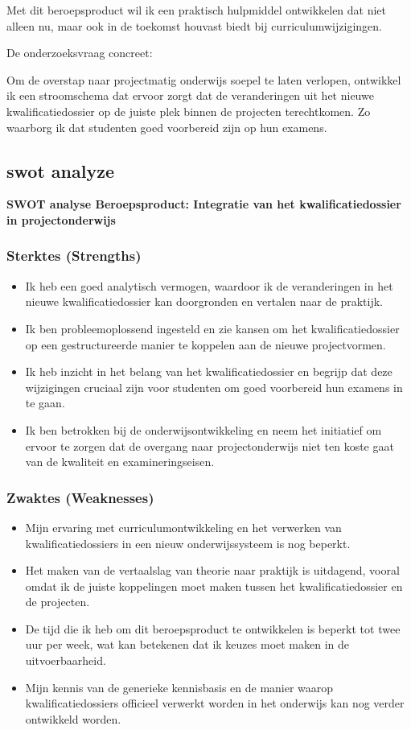 Met dit beroepsproduct wil ik een praktisch hulpmiddel ontwikkelen dat niet alleen nu, maar ook in de toekomst houvast biedt bij curriculumwijzigingen.

 
De onderzoeksvraag concreet: 
\begin{displayquote}    
    Om de overstap naar projectmatig onderwijs soepel te laten verlopen, ontwikkel ik een stroomschema dat ervoor zorgt dat de veranderingen uit het nieuwe kwalificatiedossier op de juiste plek binnen de projecten terechtkomen. Zo waarborg ik dat studenten goed voorbereid zijn op hun examens. 
\end{displayquote}


\subsection{swot analyze}

\textbf{SWOT analyse  Beroepsproduct: Integratie van het kwalificatiedossier in projectonderwijs}

\subsubsection{Sterktes (Strengths)}
\begin{itemize}
    \item Ik heb een goed analytisch vermogen, waardoor ik de veranderingen in het nieuwe kwalificatiedossier kan doorgronden en vertalen naar de praktijk.
    \item Ik ben probleemoplossend ingesteld en zie kansen om het kwalificatiedossier op een gestructureerde manier te koppelen aan de nieuwe projectvormen.
    \item Ik heb inzicht in het belang van het kwalificatiedossier en begrijp dat deze wijzigingen cruciaal zijn voor studenten om goed voorbereid hun examens in te gaan.
    \item Ik ben betrokken bij de onderwijsontwikkeling en neem het initiatief om ervoor te zorgen dat de overgang naar projectonderwijs niet ten koste gaat van de kwaliteit en examineringseisen.
\end{itemize}

\subsubsection{Zwaktes (Weaknesses)}
\begin{itemize}
    \item  Mijn ervaring met curriculumontwikkeling en het verwerken van kwalificatiedossiers in een nieuw onderwijssysteem is nog beperkt.
    \item Het maken van de vertaalslag van theorie naar praktijk is uitdagend, vooral omdat ik de juiste koppelingen moet maken tussen het kwalificatiedossier en de projecten.
    \item De tijd die ik heb om dit beroepsproduct te ontwikkelen is beperkt tot twee uur per week, wat kan betekenen dat ik keuzes moet maken in de uitvoerbaarheid.
    \item Mijn kennis van de generieke kennisbasis en de manier waarop kwalificatiedossiers officieel verwerkt worden in het onderwijs kan nog verder ontwikkeld worden.
\end{itemize}

